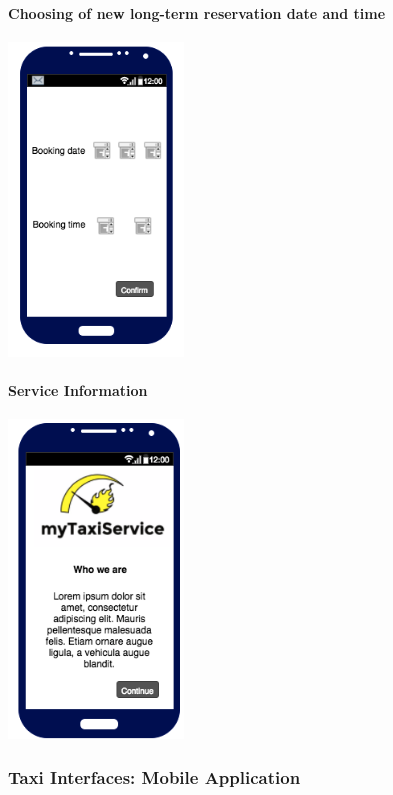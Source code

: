 		\paragraph{Choosing of new long-term reservation date and time}
		\begin{center}
		    \includegraphics[width=0.35\textwidth]{./images/TELEFONO5User}
		\end{center}
		\paragraph{Service Information}
		\begin{center}
		    \includegraphics[width=0.35\textwidth]{./images/TELEFONO6User}
		\end{center}
		
		
		\subsubsection{Taxi Interfaces: Mobile Application}
